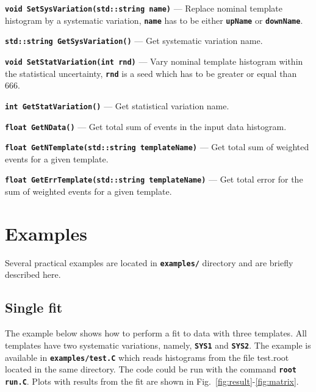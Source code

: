 \documentclass[12pt]{article}
\newcommand\verbbf[1]{\textcolor[rgb]{0,0,1}{\texttt{\textbf{#1}}}}
\newcommand\verbbfb[1]{\textcolor[rgb]{0,0,0}{\texttt{\textbf{#1}}}}
\begin{document}
\noindent \verbbf{void SetSysVariation(std::string name)} --- Replace
nominal template histogram by a systematic variation, \verbbfb{name}
has to be either \verbbfb{upName} or \verbbfb{downName}.

\vspace{0.3cm}

\noindent \verbbf{std::string GetSysVariation()} ---
Get systematic variation name.

\vspace{0.3cm}

\noindent \verbbf{void SetStatVariation(int rnd)} ---
Vary nominal template histogram within the statistical uncertainty,
\verbbfb{rnd} is a seed which has to be greater or equal than 666.

\vspace{0.3cm}

\noindent \verbbf{int GetStatVariation()} ---
Get statistical variation name.

\vspace{0.3cm}

\noindent \verbbf{float GetNData()} ---
Get total sum of events in the input data histogram.

\vspace{0.3cm}

\noindent \verbbf{float GetNTemplate(std::string templateName)} ---
Get total sum of weighted events for a given template.

\vspace{0.3cm}

\noindent \verbbf{float GetErrTemplate(std::string templateName)} ---
Get total error for the sum of weighted events for a given template.

\section{Examples}

Several practical examples are located in \verbbfb{examples/} directory and are briefly
described here.

\subsection{Single fit}

The example below shows how to perform a fit to data with three
templates. All templates have two systematic variations, namely,
\verbbfb{SYS1} and \verbbfb{SYS2}. The example is available in
\verbbfb{examples/test.C} which reads histograms from the file test.root located
in the same directory. The code could be run with the command \verbbfb{root
run.C}. Plots with results from the fit are shown in
Fig.~\ref{fig:result}-\ref{fig:matrix}.
\end{document}
